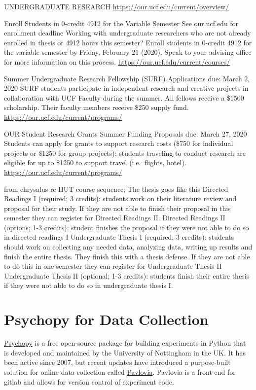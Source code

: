 \documentclass[
]{book}
\begin{document}
UNDERGRADUATE RESEARCH
\url{https://our.ucf.edu/current/overview/}

Enroll Students in 0-credit 4912 for the Variable Semester
See our.ucf.edu for enrollment deadline
Working with undergraduate researchers who are not already enrolled in thesis or 4912 hours this semester? Enroll students in 0-credit 4912 for the variable semester by Friday, February 21 (2020). Speak to your advising office for more information on this process.
\url{https://our.ucf.edu/current/courses/}

Summer Undergraduate Research Fellowship (SURF)
Applications due: March 2, 2020
SURF students participate in independent research and creative projects in collaboration with UCF Faculty during the summer. All fellows receive a \$1500 scholarship. Their faculty members receive \$250 supply fund.
\url{https://our.ucf.edu/current/programs/}

OUR Student Research Grants Summer Funding
Proposals due: March 27, 2020
Students can apply for grants to support research costs (\$750 for individual projects or \$1250 for group projects); students traveling to conduct research are eligible for up to \$1250 to support travel (i.e.~flights, hotel).
\url{https://our.ucf.edu/current/programs/}

from chrysalus re HUT course sequence;
The thesis goes like this
Directed Readings I (required; 3 credits): students work on their literature review and proposal for their study. If they are not able to finish their proposal in this semester they can register for Directed Readings II.
Directed Readings II (options; 1-3 credits): student finishes the proposal if they were not able to do so in directed readings I
Undergraduate Thesis I (required; 3 credits): students should work on collecting any needed data, analyzing data, writing up results and finish the entire thesis. They finish this with a thesis defense. If they are not able to do this in one semester they can register for Undergraduate Thesis II
Undergraduate Thesis II (optional; 1-3 credits): students finish their entire thesis if they were not able to do so in undergraduate thesis I.

\hypertarget{psychopy}{%
\chapter{Psychopy for Data Collection}\label{psychopy}}

\href{https://www.psychopy.org}{Psychopy} is a free open-source package for building experiments in Python that is developed and maintained by the University of Nottingham in the UK. It has been active since 2007, but recent updates have introduced a purpose-built solution for online data collection called \href{https://pavlovia.org/\#about}{Pavlovia}. Pavlovia is a front-end for gitlab and allows for version control of experiment code.
\end{document}
